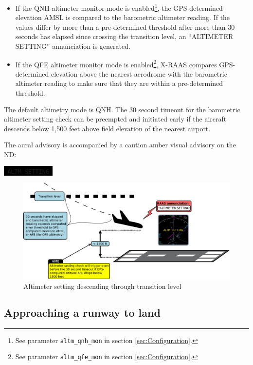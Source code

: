 \documentclass[a4paper,12pt]{article}
\newcommand{\visualadvisory}[3][b]{%
    \ifthenelse{\equal{#1}{b}}{\begin{center}}{}
    \noindent
    \colorbox{black}{\textcolor{#2visualadvisorycolor}{\large\texttt{~#3~}}}
    \ifthenelse{\equal{#1}{b}}{\end{center}}{}}
\newcommand{\confopt}[1]{\texttt{#1}}
\begin{document}
\begin{itemize}

\item If the QNH altimeter monitor mode is enabled\footnote{See parameter
\confopt{altm\_qnh\_mon} in section \ref{sec:Configuration}.}, the
GPS-determined elevation AMSL is compared to the barometric altimeter
reading. If the values differ by more than a pre-determined threshold
after more than 30 seconds has elapsed since crossing the transition
level, an “ALTIMETER SETTING” annunciation is generated.

\item If the QFE altimeter monitor mode is enabled\footnote{See parameter
\confopt{altm\_qfe\_mon} in section \ref{sec:Configuration}.}, X-RAAS compares
GPS-determined elevation above the nearest aerodrome with the barometric
altimeter reading to make sure that they are within a pre-determined
threshold.

\end{itemize}

\noindent The default altimetry mode is QNH. The 30 second timeout for
the barometric altimeter setting check can be preempted and initiated
early if the aircraft descends below 1,500 feet above field elevation of
the nearest airport.

The aural advisory is accompanied by a caution amber visual advisory on
the ND:

\visualadvisory{nonroutine}{ALTM SETTING}

\begin{figure}[H]
\begin{center}
\includegraphics[width=\textwidth]{../src/alt_setting_des.pdf}
\end{center}
\caption{Altimeter setting descending through transition level}
\end{figure}

\subsection{Approaching a runway to land}
\label{subsec:ApchAirMon}
\end{document}
